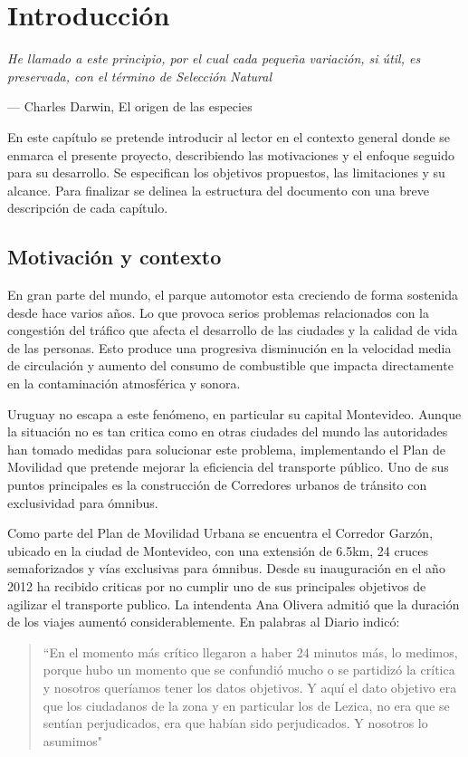 \chapter{Introducción}
\epigraph{ \textit{He llamado a este principio, por el cual cada pequeña variación, si útil, es preservada, con el término de Selección Natural}}{--- Charles Darwin, El origen de las especies}

En este capítulo se pretende introducir al lector en el contexto general donde se enmarca el presente proyecto, describiendo las motivaciones y el enfoque seguido para su desarrollo. Se especifican los objetivos propuestos, las limitaciones y su alcance. Para finalizar se delinea la estructura del documento con una breve descripción de cada capítulo. 

\section{Motivación y contexto}

En gran parte del mundo, el parque automotor esta creciendo de forma sostenida desde hace varios años. Lo que provoca serios problemas relacionados con la congestión del tráfico que afecta el desarrollo de las ciudades y la calidad de vida de las personas. Esto produce una progresiva disminución en la velocidad media de circulación y aumento del consumo de combustible que impacta directamente en la contaminación atmosférica y sonora.

Uruguay no escapa a este fenómeno, en particular su capital Montevideo. Aunque la situación no es tan critica como en otras ciudades del mundo las autoridades han tomado medidas para solucionar este problema, implementando el Plan de Movilidad que pretende mejorar la eficiencia del transporte público. Uno de sus puntos principales es la construcción de Corredores urbanos de tránsito con exclusividad para ómnibus.

Como parte del Plan de Movilidad Urbana se encuentra el Corredor Garzón, ubicado en la ciudad de Montevideo, con una extensión de 6.5km, 24 cruces semaforizados y vías exclusivas para ómnibus. Desde su inauguración en el año 2012 ha recibido criticas por no cumplir uno de sus principales objetivos de agilizar el transporte publico. La intendenta Ana Olivera admitió que la duración de los viajes aumentó considerablemente. En palabras al Diario \cite{olivera2015} indicó: 


\begin{quote}\small
	``En el momento más crítico llegaron a haber 24 minutos más, lo medimos, porque hubo un momento que se confundió mucho o se partidizó la crítica y nosotros queríamos tener los datos objetivos. Y aquí el dato objetivo era que los ciudadanos de la zona y en particular los de Lezica, no era que se sentían perjudicados, era que habían sido perjudicados. Y nosotros lo asumimos"
\end{quote}


